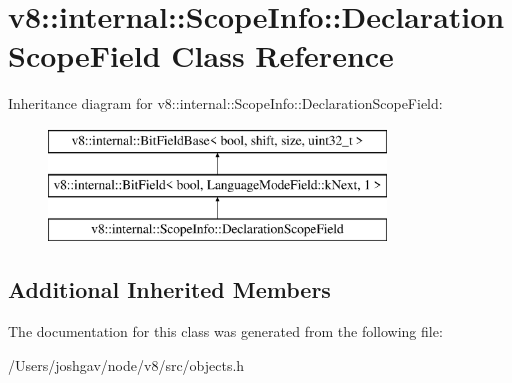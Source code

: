 \hypertarget{classv8_1_1internal_1_1_scope_info_1_1_declaration_scope_field}{}\section{v8\+:\+:internal\+:\+:Scope\+Info\+:\+:Declaration\+Scope\+Field Class Reference}
\label{classv8_1_1internal_1_1_scope_info_1_1_declaration_scope_field}
Inheritance diagram for v8\+:\+:internal\+:\+:Scope\+Info\+:\+:Declaration\+Scope\+Field\+:\begin{figure}[H]
\begin{center}
\leavevmode
\includegraphics[height=3.000000cm]{classv8_1_1internal_1_1_scope_info_1_1_declaration_scope_field}
\end{center}
\end{figure}
\subsection*{Additional Inherited Members}


The documentation for this class was generated from the following file\+:\begin{DoxyCompactItemize}
\item 
/\+Users/joshgav/node/v8/src/objects.\+h\end{DoxyCompactItemize}
